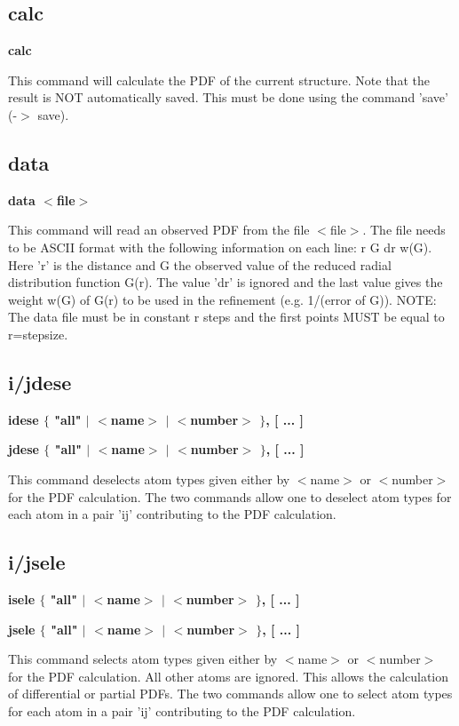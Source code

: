\subsection*{calc}
{\bf calc \par }
\par
\vspace{3pt}
This command will calculate the PDF of the current structure. 
Note that the result is NOT automatically saved. This must be 
done using the command 'save' (-$> $ save). 
\subsection*{data}
{\bf data $ <$file$> $ \par }
\par
\vspace{3pt}
This command will read an observed PDF from the file $ <$file$> $. 
The file needs to be ASCII format with the following information 
on each line: r G dr w(G). Here 'r' is the distance and G the 
observed value of the reduced radial distribution function G(r). 
The value 'dr' is ignored and the last value gives the weight 
w(G) of G(r) to be used in the refinement (e.g. 1/(error of G)). 
NOTE: The data file must be in constant r steps and the first 
points MUST be equal to r=stepsize. 
\subsection*{i/jdese}
{\bf idese $ \{$ "all" $| $ $ <$name$> $ $| $ $ <$number$> $ $\} $, [ ... ] \par }
{\bf jdese $ \{$ "all" $| $ $ <$name$> $ $| $ $ <$number$> $ $\} $, [ ... ] \par }
\par
\vspace{3pt}
This command deselects atom types given either by $ <$name$> $ or $ <$number$> $ 
for the PDF calculation. The two commands allow one to deselect 
atom types for each atom in a pair 'ij' contributing to the PDF 
calculation. 
\subsection*{i/jsele}
{\bf isele $ \{$ "all" $| $ $ <$name$> $ $| $ $ <$number$> $ $\} $, [ ... ] \par }
{\bf jsele $ \{$ "all" $| $ $ <$name$> $ $| $ $ <$number$> $ $\} $, [ ... ] \par }
\par
\vspace{3pt}
This command selects atom types given either by $ <$name$> $ or $ <$number$> $ 
for the PDF calculation. All other atoms are ignored. This allows 
the calculation of differential or partial PDFs. The two commands 
allow one to select atom types for each atom in a pair 'ij' 
contributing to the PDF calculation. 
